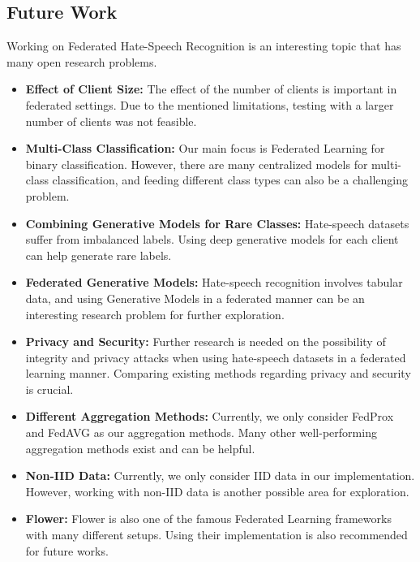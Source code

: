 \documentclass[11pt]{article}
\begin{document}
\subsection{Future Work}
Working on Federated Hate-Speech Recognition is an interesting topic that has many open research problems.
\begin{itemize}
    \item \textbf{Effect of Client Size:} The effect of the number of clients is important in federated settings. Due to the mentioned limitations, testing with a larger number of clients was not feasible.
    \item \textbf{Multi-Class Classification:} Our main focus is Federated Learning for binary classification. However, there are many centralized models for multi-class classification, and feeding different class types can also be a challenging problem.
    \item \textbf{Combining Generative Models for Rare Classes:} Hate-speech datasets suffer from imbalanced labels. Using deep generative models for each client can help generate rare labels.
    \item \textbf{Federated Generative Models:} Hate-speech recognition involves tabular data, and using Generative Models in a federated manner can be an interesting research problem for further exploration.
    \item \textbf{Privacy and Security:} Further research is needed on the possibility of integrity and privacy attacks when using hate-speech datasets in a federated learning manner. Comparing existing methods regarding privacy and security is crucial.
    \item \textbf{Different Aggregation Methods:} Currently, we only consider FedProx and FedAVG as our aggregation methods. Many other well-performing aggregation methods exist and can be helpful.
    \item \textbf{Non-IID Data:} Currently, we only consider IID data in our implementation. However, working with non-IID data is another possible area for exploration.
    \item \textbf{Flower:} Flower is also one of the famous Federated Learning frameworks with many different setups. Using their implementation is also recommended for future works.

\end{itemize}





\end{document}
